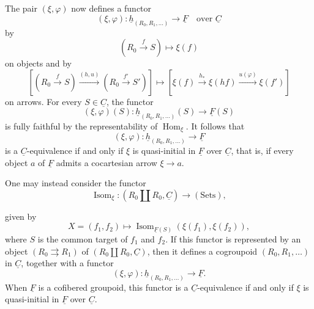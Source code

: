 The pair $(\xi,\varphi)$ now defines a functor
\[
 (\xi,\varphi):\underline h_{(R_0,R_1,\ldots)}
 \longrightarrow\underline F
 \quad\text{over }\underline C
\]
by
\[
 (R_0\xrightarrow fS)\longmapsto\xi(f)
\]
on objects and by
\[
 \left[(R_0\xrightarrow fS)
 \xrightarrow{(h,u)}(R_0\xrightarrow{f'}S')\right]
 \longmapsto
 \left[\xi(f)\xrightarrow{h_*}\xi(hf)
 \xrightarrow{u(\varphi)}\xi(f')\right]
\]
on arrows. For every $S\in\underline C$, the functor
\[
 (\xi,\varphi)(S):
 \underline h_{(R_0,R_1,\ldots)}(S)\longrightarrow\underline F(S)
\]
is fully faithful by the representability of
$\operatorname{Hom}_\xi$. It follows that
\[
 (\xi,\varphi):\underline h_{(R_0,R_1,\ldots)}
 \longrightarrow\underline F
\]
is a $\underline C$-equivalence if and only if $\xi$ is quasi-initial
in $\underline F$ over $\underline C$, that is, if every object $a$
of $\underline F$ admits a cocartesian arrow $\xi\longrightarrow a$.

One may instead consider the functor
\[
 \operatorname{Isom}_\xi:
 (R_0\amalg R_0,\underline C)\longrightarrow(\mathrm{Sets}),
\]


given by
\[
 X=(f_1,f_2)\longmapsto
 \operatorname{Isom}_{\underline F(S)}(\xi(f_1),\xi(f_2)),
\]
where $S$ is the common target of $f_1$ and $f_2$. If this functor is
represented by an object $(R_0\rightrightarrows R_1)$ of
$(R_0\amalg R_0,\underline C)$, then it defines a cogroupoid
$(R_0,R_1,\ldots)$ in $\underline C$, together with a functor
\[
 (\xi,\varphi):\underline h_{(R_0,R_1,\ldots)}
 \longrightarrow\underline F.
\]
When $\underline F$ is a cofibered groupoid, this functor is a
$\underline C$-equivalence if and only if $\xi$ is quasi-initial in
$\underline F$ over $\underline C$.
